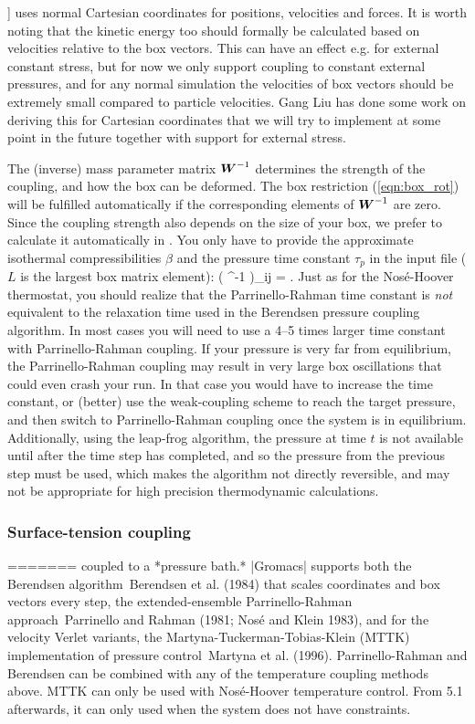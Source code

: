 {\gromacs] uses normal Cartesian coordinates for positions, 
velocities and forces. It is worth noting that the kinetic energy too
should formally be calculated based on velocities relative to the
box vectors. This can have an effect e.g. for external constant stress,
but for now we only support coupling to constant external 
pressures, and for any normal simulation the velocities of box
vectors should be extremely small compared to particle velocities.
Gang Liu has done some work on deriving this for Cartesian
coordinates\cite{Liu2015} that we will try to implement at
some point in the future together with support for external stress.

The (inverse) mass parameter matrix
$\ve{W}^{-1}$ determines the strength of the coupling, and how the box
can be deformed.  The box restriction (\ref{eqn:box_rot}) will be
fulfilled automatically if the corresponding elements of $\ve{W}^{-1}$
are zero. Since the coupling strength also depends on the size of your
box, we prefer to calculate it automatically in {\gromacs}.  You only
have to provide the approximate isothermal compressibilities
{\boldmath $\beta$} and the pressure time constant $\tau_p$ in the
input file ($L$ is the largest box matrix element): \beq \left(
^{-1} \right)_{ij} = .
\eeq Just as for the Nos{\'e}-Hoover thermostat, you should realize
that the Parrinello-Rahman time constant is {\em not} equivalent to
the relaxation time used in the Berendsen pressure coupling algorithm.
In most cases you will need to use a 4--5 times larger time constant
with Parrinello-Rahman coupling. If your pressure is very far from
equilibrium, the Parrinello-Rahman coupling may result in very large
box oscillations that could even crash your run.  In that case you
would have to increase the time constant, or (better) use the weak-coupling
scheme to reach the target pressure, and then switch to
Parrinello-Rahman coupling once the system is in equilibrium.
Additionally, using the leap-frog algorithm, the pressure at time $t$
is not available until after the time step has completed, and so the
pressure from the previous step must be used, which makes the algorithm
not directly reversible, and may not be appropriate for high precision
thermodynamic calculations.

\subsubsection{Surface-tension coupling}
=======
coupled to a *pressure bath.* |Gromacs| supports both the Berendsen
algorithm Berendsen et al. (1984) that scales coordinates and box
vectors every step, the extended-ensemble Parrinello-Rahman
approach Parrinello and Rahman (1981; Nosé and Klein 1983), and for the
velocity Verlet variants, the Martyna-Tuckerman-Tobias-Klein (MTTK)
implementation of pressure control Martyna et al. (1996).
Parrinello-Rahman and Berendsen can be combined with any of the
temperature coupling methods above. MTTK can only be used with
Nosé-Hoover temperature control. From 5.1 afterwards, it can only used
when the system does not have constraints.

}

